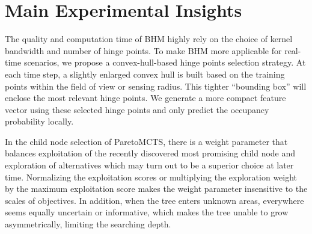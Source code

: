 \vspace{-15pt}
\section{Main Experimental Insights}\label{sec:insights}%
The quality and computation time of BHM highly rely on the choice of kernel bandwidth and number of hinge points.
To make BHM more applicable for real-time scenarios, we propose a convex-hull-based hinge points selection strategy.
At each time step, a slightly enlarged convex hull is built based on the training points within the field of view or sensing radius.
This tighter ``bounding box'' will enclose the most relevant hinge points.
We generate a more compact feature vector using these selected hinge points and only predict the occupancy probability locally.


In the child node selection of ParetoMCTS, there is a weight parameter that balances exploitation of the recently discovered most promising child node and exploration of alternatives which may turn out to be a superior choice at later time.
Normalizing the exploitation scores or multiplying the exploration weight by the maximum exploitation score makes the weight parameter insensitive to the scales of objectives. 
In addition, when the tree enters unknown areas, everywhere seems equally uncertain or informative, which makes the tree unable to grow asymmetrically, limiting the searching depth.
